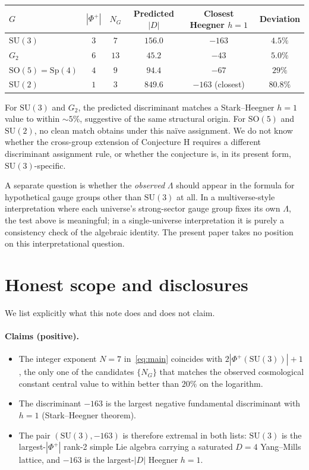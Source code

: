 \documentclass[11pt,a4paper]{article}
\newcommand{\SU}{\mathrm{SU}}
\newcommand{\SO}{\mathrm{SO}}
\newcommand{\Sp}{\mathrm{Sp}}
\theoremstyle{plain}
\begin{document}
\begin{center}
\begin{tabular}{lccccc}
\toprule
$G$ & $|\Phi^{+}|$ & $N_{G}$ & Predicted $|D|$ & Closest Heegner $h=1$ & Deviation \\
\midrule
$\SU(3)$ & $3$ & $7$ & $156.0$ & $-163$ & $4.5\%$ \\
$G_{2}$ & $6$ & $13$ & $45.2$ & $-43$ & $5.0\%$ \\
$\SO(5)=\Sp(4)$ & $4$ & $9$ & $94.4$ & $-67$ & $29\%$ \\
$\SU(2)$ & $1$ & $3$ & $849.6$ & $-163$ (closest) & $80.8\%$ \\
\bottomrule
\end{tabular}
\end{center}

For $\SU(3)$ and $G_{2}$, the predicted discriminant matches a Stark--Heegner $h=1$ value to within $\sim 5\%$, suggestive of the same structural origin. For $\SO(5)$ and $\SU(2)$, no clean match obtains under this naïve assignment. We do not know whether the cross-group extension of Conjecture H requires a different discriminant assignment rule, or whether the conjecture is, in its present form, $\SU(3)$-specific.

A separate question is whether the \emph{observed} $\Lambda$ should appear in the formula for hypothetical gauge groups other than $\SU(3)$ at all. In a multiverse-style interpretation where each universe's strong-sector gauge group fixes its own $\Lambda$, the test above is meaningful; in a single-universe interpretation it is purely a consistency check of the algebraic identity. The present paper takes no position on this interpretational question.

\section{Honest scope and disclosures}\label{sec:scope}

We list explicitly what this note does and does not claim.

\paragraph{Claims (positive).}
\begin{itemize}[leftmargin=2em]
  \item The integer exponent $N=7$ in~\eqref{eq:main} coincides with $2|\Phi^{+}(\SU(3))|+1$, the only one of the candidates $\{N_{G}\}$ that matches the observed cosmological constant central value to within better than $20\%$ on the logarithm.
  \item The discriminant $-163$ is the largest negative fundamental discriminant with $h=1$ (Stark--Heegner theorem).
  \item The pair $(\SU(3),-163)$ is therefore extremal in both lists: $\SU(3)$ is the largest-$|\Phi^{+}|$ rank-2 simple Lie algebra carrying a saturated $D=4$ Yang--Mills lattice, and $-163$ is the largest-$|D|$ Heegner $h=1$.
\end{itemize}
\end{document}
